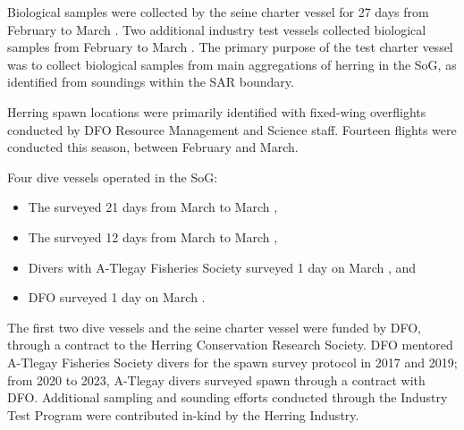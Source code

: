 Biological samples were collected by the seine charter vessel
 for 27 days from February  to March .
Two additional industry test vessels collected biological samples
from February  to March .
The primary purpose of the test charter vessel was to
collect biological samples from main aggregations of herring in the SoG,
as identified from soundings within the SAR boundary.

Herring spawn locations were primarily identified with
fixed-wing overflights conducted by DFO Resource Management and Science staff.
Fourteen flights were conducted this season, between February and March.

Four dive vessels operated in the SoG:

\begin{itemize}

\item The  surveyed 21 days from
March  to March ,

\item The  surveyed 12 days from
March  to March ,

\item Divers with A-Tlegay Fisheries Society surveyed 1 day on
March , and

\item DFO surveyed 1 day on March .

\end{itemize}

The first two dive vessels and the seine charter vessel 
were funded by DFO,
through a contract to the Herring Conservation Research Society.
DFO mentored A-Tlegay Fisheries Society divers
for the spawn survey protocol in 2017 and 2019;
from 2020 to 2023, A-Tlegay divers surveyed spawn through a
contract with DFO.
Additional sampling and sounding efforts conducted through the
Industry Test Program were contributed in-kind by the Herring Industry.